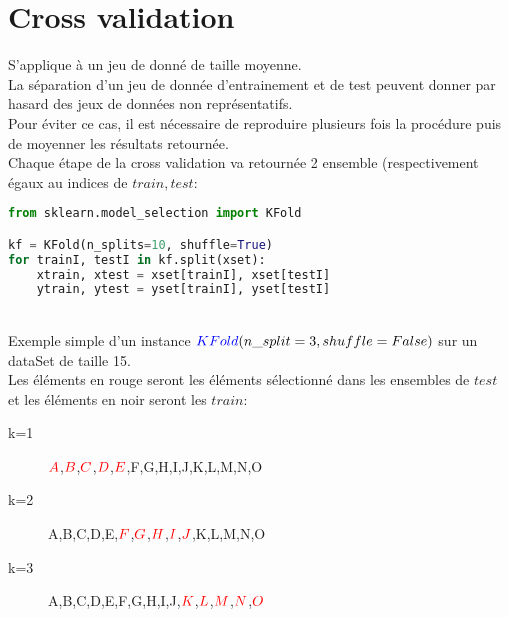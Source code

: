 \pagebreak
\section{Cross validation}
S'applique à un jeu de donné de taille moyenne.\\
La séparation d'un jeu de donnée d'entrainement et de test peuvent donner par hasard des jeux de données non représentatifs.\\
Pour éviter ce cas, il est nécessaire de reproduire plusieurs fois la procédure puis de moyenner les résultats retournée.\\
Chaque étape de la cross validation va retournée 2 ensemble (respectivement égaux au indices de $train,test$:\\

\lstset{style=mlpythoncode}
\begin{lstlisting}[language=Python]
from sklearn.model_selection import KFold

kf = KFold(n_splits=10, shuffle=True)
for trainI, testI in kf.split(xset):
    xtrain, xtest = xset[trainI], xset[testI]
    ytrain, ytest = yset[trainI], yset[testI]
\end{lstlisting}
\ \\
Exemple simple d'un instance $\textcolor{blue}{KFold}(n\_split=3, shuffle=False)$ sur un dataSet de taille 15.\\
Les éléments en rouge seront les éléments sélectionné dans les ensembles de $test$ et les éléments en noir seront les $train$:\\
\begin{description}
\item[k=1] $\textcolor{red}{A}$,$\textcolor{red}{B}$,$\textcolor{red}{C}$,$\textcolor{red}{D}$,$\textcolor{red}{E}$,F,G,H,I,J,K,L,M,N,O
\item[k=2] A,B,C,D,E,$\textcolor{red}{F}$,$\textcolor{red}{G}$,$\textcolor{red}{H}$,$\textcolor{red}{I}$,$\textcolor{red}{J}$,K,L,M,N,O
\item[k=3] A,B,C,D,E,F,G,H,I,J,$\textcolor{red}{K}$,$\textcolor{red}{L}$,$\textcolor{red}{M}$,$\textcolor{red}{N}$,$\textcolor{red}{O}$
\end{description}

